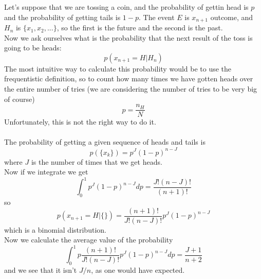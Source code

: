 Let's suppose that we are tossing a coin, and the probability of gettin head is $p$ and the probability of getting tails is $1-p$. The event $E$ is $x_{n+1}$ outcome, and $H_n$ is $\{x_1,x_2,...\}$, so the first is the future and the second is the past. \\
Now we ask ourselves what is the probability that the next result of the toss is going to be heads:
$$
	p(x_{n+1}=H | H_n) 
$$
The most intuitive way to calculate this probability would be to use the frequentistic definition, so to count how many times we have gotten heads over the entire number of tries (we are considering the number of tries to be very big of course)
$$
	p = \frac{n_H}{N}
$$
Unfortunately, this is not the right way to do it. \\ \\
The probability of getting a given sequence of heads and tails is
$$
	p(\{x_k\}) = p^J(1-p)^{n-J}
$$
where $J$ is the number of times that we get heads. \\
Now if we integrate we get
$$
	\int_0^1 p^J(1-p)^{n-J}dp = \frac{J!(n-J)!}{(n+1)!}
$$
so
$$
	p(x_{n+1}=H|\{\}) = \frac{(n+1)!}{J!(n-J)!}p^J(1-p)^{n-J}
$$
which is a binomial distribution. \\
Now we calculate the average value of the probability
$$
\int_0^1 p\frac{(n+1)!}{J!(n-J)!}p^J(1-p)^{n-J}dp = \frac{J+1}{n+2}
$$
and we see that it isn't $J/n$, as one would have expected. 
